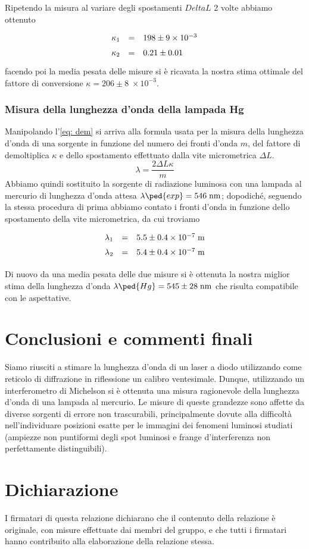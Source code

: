 \documentclass[10pt, a4paper, italian]{article}
\begin{document}
Ripetendo la misura al variare degli spostamenti $Delta L$ 2 volte abbiamo
ottenuto 
\[
\def\arraystretch{1.5}
\begin{array}{rcl}
\kappa_1 & = & 198 \pm 9 \times 10^{-3} \\
\kappa_2 & = & 0.21 \pm 0.01 \\
\end{array}
\]
facendo poi la media pesata delle misure si è ricavata la nostra stima
ottimale del fattore di conversione
$\kappa = 206 \pm 8 \; \times 10^{-3}$.

\subsubsection{Misura della lunghezza d'onda della lampada Hg}
Manipolando l'\cref{eq: dem} si arriva alla formula usata per la misura della
lunghezza d'onda di una sorgente in funzione del numero dei fronti
d'onda $m$, del fattore di demoltiplica $\kappa$ e dello spostamento effettuato
dalla vite micrometrica $\Delta L$.
\[
\lambda = \frac{2 \Delta L \kappa}{m}
\]
Abbiamo quindi sostituito la sorgente di radiazione luminosa con una lampada
al mercurio di lunghezza d'onda attesa $\lambda\ped{exp} = 546 \; \si{n\m}$;
dopodiché, seguendo la stessa procedura di prima abbiamo contato i fronti
d'onda in funzione dello spostamento della vite micrometrica, da cui troviamo
\[
\def\arraystretch{1.5}
\begin{array}{rcl}
\lambda_1 & = & 5.5 \pm 0.4 \times 10^{-7} \; \si{m} \\
\lambda_2 & = & 5.4 \pm 0.4 \times 10^{-7} \; \si{m} \\
\end{array}
\]

Di nuovo da una media pesata delle due misure si è ottenuta la nostra miglior
stima della lunghezza d'onda $\lambda\ped{Hg} = 545 \pm 28 \; \si{n\m}$ che
risulta compatibile con le aspettative.

\section*{Conclusioni e commenti finali}
Siamo riusciti a stimare la lunghezza d'onda di un laser a diodo utilizzando
come reticolo di diffrazione in riflessione un calibro ventesimale.
Dunque, utilizzando un interferometro di Michelson si è ottenuta una misura
ragionevole della lunghezza d'onda di una lampada al mercurio.
Le misure di queste grandezze sono affette da diverse sorgenti di errore non
trascurabili, principalmente dovute alla difficoltà nell'individuare posizioni
esatte per le immagini dei fenomeni luminosi studiati (ampiezze non puntiformi
degli spot luminosi e frange d'interferenza non perfettamente distinguibili).

\section*{Dichiarazione}
I firmatari di questa relazione dichiarano che il contenuto della relazione \`e
originale, con misure effettuate dai membri del gruppo, e che tutti i firmatari
hanno contribuito alla elaborazione della relazione stessa.
\end{document}
